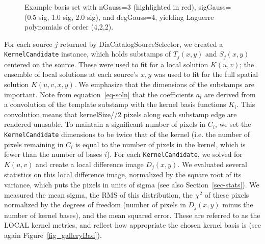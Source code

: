 \documentclass[prd, nofootinbib, floatfix, 11pt,tightenlines,times]{article}
\begin{document}
\begin{figure}
\caption{Example basis set with nGauss=3 (highlighted in red),
  sigGauss=(0.5 sig, 1.0 sig, 2.0 sig), and degGauss=4, yielding
  Laguerre polynomials of order (4,2,2).}
\label{basis}
\end{figure}

For each source $j$ returned by DiaCatalogSourceSelector, we created a
{\tt KernelCandidate} instance, which holds substamps of $T_j(x,y)$
and $S_j(x,y)$ centered on the source.  These were used to fit for a
local solution $K(u,v)$; the ensemble of local solutions at each
source's $x,y$ was used to fit for the full spatial solution
$K(u,v,x,y)$.  We emphasize that the dimensions of the substamps are
important.  Note from equation~\ref{eq-soln} that the coefficients
$a_i$ are derived from a convolution of the template substamp with the
kernel basis functions $K_i$.  This convolution means that
kernelSize//2 pixels along each substamp edge are rendered unusable.
To maintain a significant number of pixels in $C_i$, we set the {\tt
  KernelCandidate} dimensions to be twice that of the kernel (i.e. the
number of pixels remaining in $C_i$ is equal to the number of pixels
in the kernel, which is fewer than the number of bases $i$).  For each
{\tt KernelCandidate}, we solved for $K(u,v)$ and create a local
difference image $D_j(x,y)$.  We evaluated several statistics on this
local difference image, normalized by the square root of its variance,
which puts the pixels in units of sigma (see also
Section~\ref{sec-stats}).  We measured the mean sigma, the RMS of this
distribution, the $\chi^2$ of these pixels normalized by the degrees
of freedom (number of pixels in $D_j(x,y)$ minus the number of kernel
bases), and the mean squared error.  These are referred to as the
LOCAL kernel metrics, and reflect how appropriate the chosen kernel
basis is (see again Figure~\ref{fig_galleryBad}).
\end{document}
